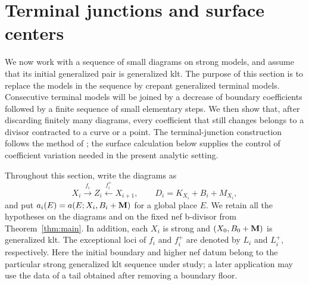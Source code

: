 \section{Terminal junctions and surface centers}\label{sec:junctions}

We now work with a sequence of small diagrams on strong models, and
assume that its initial generalized pair is
generalized klt.  The purpose of this section is to replace the models in
the sequence by crepant generalized terminal models.  Consecutive terminal
models will be joined by a decrease of boundary coefficients followed by a
finite sequence of small elementary steps.  We then show that, after
discarding finitely many diagrams, every coefficient that still changes
belongs to a divisor contracted to a curve or a point.  The terminal-junction
construction follows the method of
\cite[Section~3, Proposition~3.4]{ProjectiveLCFourfolds}; the surface
calculation below supplies the control of coefficient variation needed in
the present analytic setting.

Throughout this section, write the diagrams as
\[
 X_i\xrightarrow{f_i}Z_i\xleftarrow{f_i^+}X_{i+1},
 \qquad D_i=K_{X_i}+B_i+M_{X_i},
\]
and put $a_i(E)=a(E;X_i,B_i+\mathbf{M})$ for a global place $E$.  We retain all
the hypotheses on the diagrams and on the fixed nef b-divisor from
Theorem~\ref{thm:main}.  In addition, each $X_i$ is strong and
$(X_0,B_0+\mathbf{M})$ is generalized klt.  The exceptional
loci of $f_i$ and $f_i^+$ are denoted by $L_i$ and $L_i^+$, respectively.
Here the initial boundary and higher nef datum belong to the particular
strong generalized klt sequence under study; a later application may use
the data of a tail obtained after removing a boundary floor.

